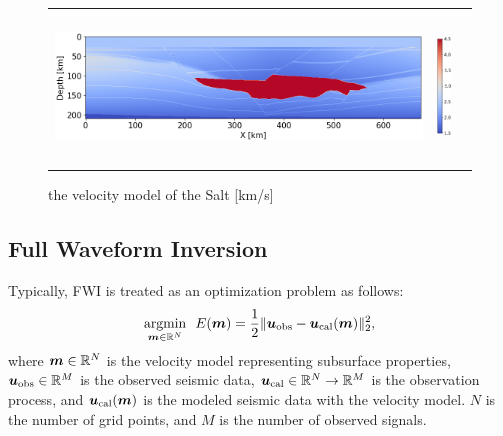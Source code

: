 \begin{figure}[htbp]
    \centering
    \begin{tabular}{m{148mm} m{10mm} m{0mm}}
        \begin{minipage}[b]{150mm}
            \centering
            \includegraphics[width=150mm]{public/full_true_vm}
        \end{minipage} &
        \begin{minipage}[b]{10mm}
            \centering
            \vspace{-2mm}
            \includegraphics[height=40mm]{public/color-bar}
        \end{minipage} &
    \end{tabular}
    \caption{the velocity model of the Salt [km/s]}
    \label{fig:salt-model}
\end{figure}



\subsection{Full Waveform Inversion}\label{subsec:full-waveform-inversion}
Typically, FWI is treated as an optimization problem as follows\cite{FWI0}:
\begin{equation} \label{eq:FWIObjective} \underset{\bm{m} \in \mathbb{R}^N}{\mathrm{argmin}} \ \ E(\bm{m}) = \frac {1} {2} \lVert  \bm{u}_{\mathrm{obs}} - \bm{u}_{\mathrm{cal}}(\bm{m})  \rVert _2^2, \end{equation}
where $\bm{m} \in \mathbb{R}^{N}$ is the velocity model representing subsurface properties, $\bm{u}_{\mathrm{obs}} \in \mathbb{R}^{M}$ is the observed seismic data, $\bm{u}_{\mathrm{cal}} \in \mathbb{R}^{N} \rightarrow \mathbb{R}^{M} $ is the observation process, and $\bm{u}_{\mathrm{cal}}(\bm{m})$ is the modeled seismic data with the velocity model.
$N$ is the number of grid points, and $M$ is the number of observed signals.

